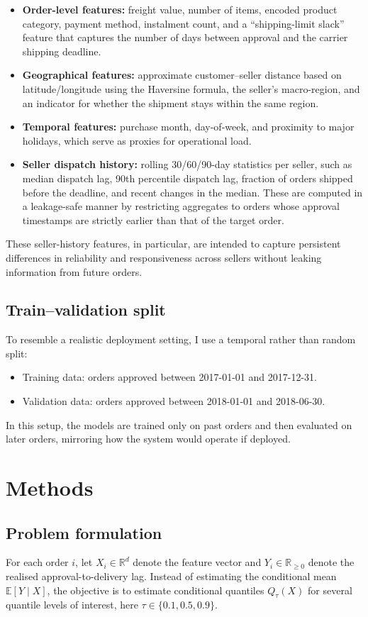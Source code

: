\documentclass[12pt]{article}
\begin{document}
\begin{itemize}
  \item \textbf{Order-level features:} freight value, number of items, encoded product category, payment method, instalment count, and a ``shipping-limit slack'' feature that captures the number of days between approval and the carrier shipping deadline.
  \item \textbf{Geographical features:} approximate customer--seller distance based on latitude/longitude using the Haversine formula, the seller’s macro-region, and an indicator for whether the shipment stays within the same region.
  \item \textbf{Temporal features:} purchase month, day-of-week, and proximity to major holidays, which serve as proxies for operational load.
  \item \textbf{Seller dispatch history:} rolling 30/60/90-day statistics per seller, such as median dispatch lag, 90th percentile dispatch lag, fraction of orders shipped before the deadline, and recent changes in the median. These are computed in a leakage-safe manner by restricting aggregates to orders whose approval timestamps are strictly earlier than that of the target order.
\end{itemize}

These seller-history features, in particular, are intended to capture persistent differences in reliability and responsiveness across sellers without leaking information from future orders.

\subsection{Train--validation split}
To resemble a realistic deployment setting, I use a temporal rather than random split:
\begin{itemize}
  \item Training data: orders approved between 2017-01-01 and 2017-12-31.
  \item Validation data: orders approved between 2018-01-01 and 2018-06-30.
\end{itemize}

In this setup, the models are trained only on past orders and then evaluated on later orders, mirroring how the system would operate if deployed.

\section{Methods}
\subsection{Problem formulation}
For each order $i$, let $X_i \in \mathbb{R}^d$ denote the feature vector and $Y_i \in \mathbb{R}_{\ge 0}$ denote the realised approval-to-delivery lag. Instead of estimating the conditional mean $\mathbb{E}[Y \mid X]$, the objective is to estimate conditional quantiles $Q_\tau(X)$ for several quantile levels of interest, here $\tau \in \{0.1, 0.5, 0.9\}$.
\end{document}
